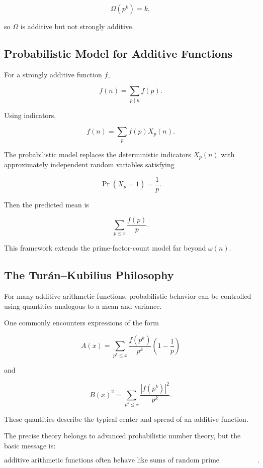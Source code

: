 \[ \Omega(p^k)=k, \]

so \(\Omega\) is additive but not strongly additive.

\subsection{Probabilistic Model for Additive Functions}
\label{subsec:additive-function-random-model}

For a strongly additive function \(f\),

\[ f(n)=\sum_{p\mid n}f(p). \]

Using indicators,

\[ f(n)=\sum_p f(p)X_p(n). \]

The probabilistic model replaces the deterministic indicators \(X_p(n)\)
with approximately independent random variables satisfying

\[ \Pr(X_p=1)=\frac1p. \]

Then the predicted mean is

\[ \sum_{p\leq x}\frac{f(p)}p. \]

This framework extends the prime-factor-count model far beyond
\(\omega(n)\).

\subsection{The Turán--Kubilius Philosophy}
\label{subsec:turan-kubilius-philosophy}

For many additive arithmetic functions, probabilistic behavior can be
controlled using quantities analogous to a mean and variance.

One commonly encounters expressions of the form

\[ A(x)=\sum_{p^k\leq x}\frac{f(p^k)}{p^k}\left(1-\frac1p\right) \]

and

\[ B(x)^2=\sum_{p^k\leq x}\frac{|f(p^k)|^2}{p^k}. \]

These quantities describe the typical center and spread of an additive
function.

The precise theory belongs to advanced probabilistic number theory, but the
basic message is:

\[
\boxed{
\text{additive arithmetic functions often behave like sums of random
prime contributions}.
}
\]

